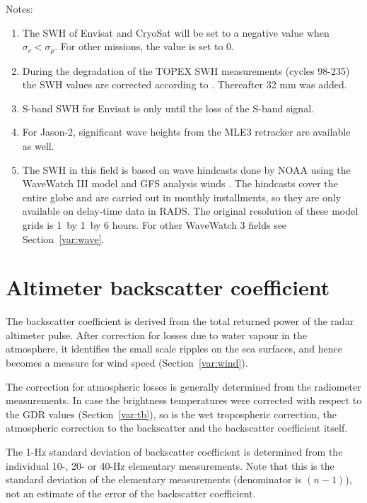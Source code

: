 \documentclass[a4paper,11pt,openany,natbib]{thesis}
\begin{document}
Notes:
\begin{enumerate}
\item The SWH of Envisat and CryoSat will be set to a negative value when $\sigma_c<\sigma_p$. For other missions, the value is set to 0.\label{item:swh_1}
\item During the degradation of the TOPEX SWH measurements (cycles 98-235) the SWH values are corrected according to \citet{queffeulou2004}. Thereafter 32 mm was added.\label{item:swh_2}
\item S-band SWH for Envisat is only until the loss of the S-band signal.\label{item:swh_3}
\item For Jason-2, significant wave heights from the MLE3 retracker are available as well.\label{item:swh_ku_mle3}
\item The SWH in this field is based on wave hindcasts done by NOAA using the WaveWatch III model and GFS analysis winds \citep{chawla2011}. The hindcasts cover the entire globe and are carried out in monthly installments, so they are only available on delay-time data in RADS. The original resolution of these model grids is 1\deg\ by 1\deg\ by 6 hours. For other WaveWatch 3 fields see Section~\ref{var:wave}.\label{item:swh_ww3}
\end{enumerate}

\section{Altimeter backscatter coefficient}
\label{var:sig0}
The backscatter coefficient is derived from the total returned power of the radar altimeter pulse. After correction for losses due to water vapour in the atmosphere, it identifies the small scale ripples on the sea surfaces, and hence becomes a measure for wind speed (Section~\ref{var:wind}).

The correction for atmospheric losses is generally determined from the radiometer measurements. In case the brightness temperatures were corrected with respect to the GDR values (Section~\ref{var:tb}), so is the wet tropospheric correction, the atmospheric correction to the backscatter and the backscatter coefficient itself.

The 1-Hz standard deviation of backscatter coefficient is determined from the individual 10-, 20- or 40-Hz elementary measurements. Note that this is the standard deviation of the elementary measurements (denominator is $(n-1)$), not an estimate of the error of the backscatter coefficient.
\end{document}
